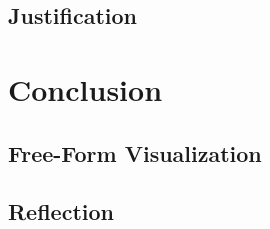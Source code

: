 \documentclass[a4paper,10pt]{article}
\begin{document}
\subsection{Justification}

\section{Conclusion}

\subsection{Free-Form Visualization}

\subsection{Reflection}

\end{document}
